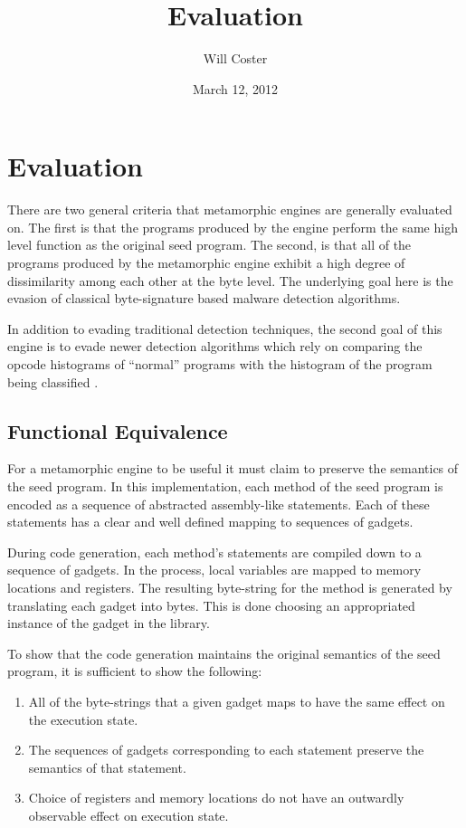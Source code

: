 \documentclass[finalcopy,short]{srpaper}
\title{Evaluation}
\author{Will Coster}
\date{March 12, 2012}
\begin{document}
    \frontmatter

    \chapter{Evaluation}

        There are two general criteria that metamorphic engines are generally
        evaluated on. The first is that the programs produced by the engine
        perform the same high level function as the original seed program. The
        second, is that all of the programs produced by the metamorphic engine
        exhibit a high degree of dissimilarity among each other at the byte
        level. The underlying goal here is the evasion of classical
        byte-signature based malware detection algorithms.

        In addition to evading traditional detection techniques, the second goal
        of this engine is to evade newer detection algorithms which rely on
        comparing the opcode histograms of ``normal'' programs with the
        histogram of the program being classified \cite{histogram}.

    \section{Functional Equivalence}

        For a metamorphic engine to be useful it must claim to preserve the
        semantics of the seed program. In this implementation, each method of
        the seed program is encoded as a sequence of abstracted assembly-like
        statements. Each of these statements has a clear and well defined
        mapping to sequences of gadgets.
        
        During code generation, each method's statements are compiled down to a
        sequence of gadgets. In the process, local variables are mapped to
        memory locations and registers. The resulting byte-string for the method
        is generated by translating each gadget into bytes. This is done
        choosing an appropriated instance of the gadget in the library.

        To show that the code generation maintains the original semantics of the
        seed program, it is sufficient to show the following:

        \begin{enumerate}

            \item All of the byte-strings that a given gadget maps to have the
                same effect on the execution state.

            \item The sequences of gadgets corresponding to each statement
                preserve the semantics of that statement.

            \item Choice of registers and memory locations do not have an
                outwardly observable effect on execution state.

        \end{enumerate}
\end{document}
